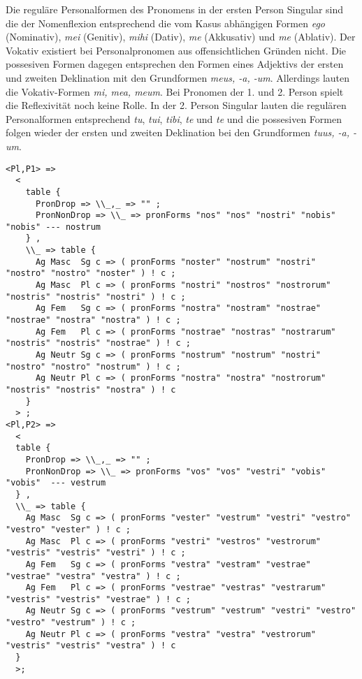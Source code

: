 Die reguläre Personalformen des Pronomens in der ersten Person Singular sind die der Nomenflexion entsprechend die vom Kasus abhängigen Formen \textit{ego} (Nominativ), \textit{mei} (Genitiv), \textit{mihi} (Dativ), \textit{me} (Akkusativ) und \textit{me} (Ablativ). Der Vokativ existiert bei Personalpronomen aus offensichtlichen Gründen nicht. Die possesiven Formen dagegen entsprechen den Formen eines Adjektivs der ersten und zweiten Deklination mit den Grundformen \textit{meus, -a, -um}. Allerdings lauten die Vokativ-Formen \textit{mi, mea, meum}. Bei Pronomen der 1. und 2. Person spielt die Reflexivität noch keine Rolle. In der 2. Person Singular lauten die regulären Personalformen entsprechend \textit{tu}, \textit{tui}, \textit{tibi}, \textit{te} und \textit{te} und die possesiven Formen folgen wieder der ersten und zweiten Deklination bei den Grundformen \textit{tuus, -a, -um}. \par
\begin{lstlisting}[float=h!tp,caption={Ausschnitt aus der Funktion \texttt{mkPronoun} für 1. und 2. Person Plural (vgl. \textbf{ResLat.gf})},label={GF-Res-MkPronoun-1u2Pl},basicstyle=\small]
<Pl,P1> => 
  < 
    table { 
      PronDrop => \\_,_ => "" ;
      PronNonDrop => \\_ => pronForms "nos" "nos" "nostri" "nobis" "nobis" --- nostrum
    } , 
    \\_ => table {
      Ag Masc  Sg c => ( pronForms "noster" "nostrum" "nostri" "nostro" "nostro" "noster" ) ! c ; 
      Ag Masc  Pl c => ( pronForms "nostri" "nostros" "nostrorum" "nostris" "nostris" "nostri" ) ! c ;
      Ag Fem   Sg c => ( pronForms "nostra" "nostram" "nostrae" "nostrae" "nostra" "nostra" ) ! c ;
      Ag Fem   Pl c => ( pronForms "nostrae" "nostras" "nostrarum" "nostris" "nostris" "nostrae" ) ! c ;
      Ag Neutr Sg c => ( pronForms "nostrum" "nostrum" "nostri" "nostro" "nostro" "nostrum" ) ! c ;
      Ag Neutr Pl c => ( pronForms "nostra" "nostra" "nostrorum" "nostris" "nostris" "nostra" ) ! c
    }
  > ; 
<Pl,P2> => 
  < 
  table {
    PronDrop => \\_,_ => "" ; 
    PronNonDrop => \\_ => pronForms "vos" "vos" "vestri" "vobis" "vobis"  --- vestrum
  } ,
  \\_ => table {
    Ag Masc  Sg c => ( pronForms "vester" "vestrum" "vestri" "vestro" "vestro" "vester" ) ! c ;
    Ag Masc  Pl c => ( pronForms "vestri" "vestros" "vestrorum" "vestris" "vestris" "vestri" ) ! c ;
    Ag Fem   Sg c => ( pronForms "vestra" "vestram" "vestrae" "vestrae" "vestra" "vestra" ) ! c ;
    Ag Fem   Pl c => ( pronForms "vestrae" "vestras" "vestrarum" "vestris" "vestris" "vestrae" ) ! c ;
    Ag Neutr Sg c => ( pronForms "vestrum" "vestrum" "vestri" "vestro" "vestro" "vestrum" ) ! c ;
    Ag Neutr Pl c => ( pronForms "vestra" "vestra" "vestrorum" "vestris" "vestris" "vestra" ) ! c
  }
  >;
\end{lstlisting}
